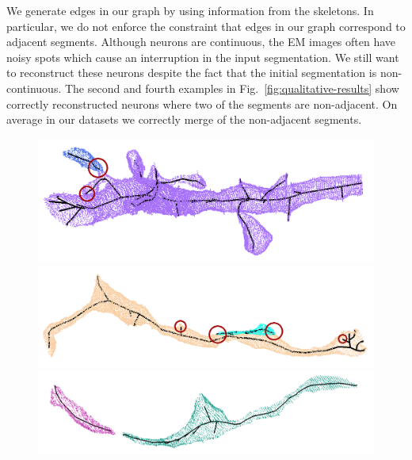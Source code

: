 We generate edges in our graph by using information from the skeletons. 
In particular, we do not enforce the constraint that edges in our graph correspond to adjacent segments.
Although neurons are continuous, the EM images often have noisy spots which cause an interruption in the input segmentation.
We still want to reconstruct these neurons despite the fact that the initial segmentation is non-continuous. 
The second and fourth examples in Fig.~\ref{fig:qualitative-results} show correctly reconstructed neurons where two of the segments are non-adjacent. 
On average in our datasets we correctly merge  of the non-adjacent segments. 
\begin{figure}[t!]
	\centering
	\begin{minipage}{0.45\linewidth}
		\includegraphics[width=\linewidth]{./figures/merge_candidate1.png}	
	\end{minipage}
	\hfill
	\begin{minipage}{0.45\linewidth}	
		\includegraphics[width=\linewidth]{./figures/merge_candidate2.png}
	\end{minipage}
	\begin{minipage}{0.45\linewidth}
		\includegraphics[width=\linewidth]{./figures/merge_candidate3.png}
	\end{minipage}

\end{figure}
